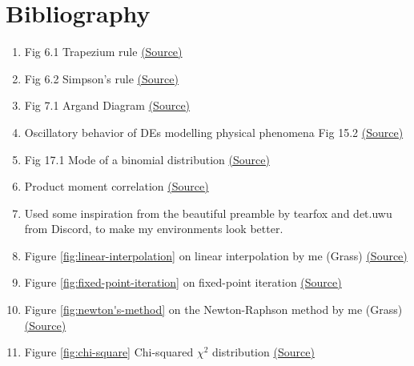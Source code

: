 \documentclass[oneside]{book}
\begin{document}
\chapter{Bibliography}
\begin{enumerate}
  \item Fig 6.1 Trapezium rule \href{https://tex.stackexchange.com/a/110618}{(Source)}
  \item Fig 6.2 Simpson's rule \href{https://tex.stackexchange.com/a/439119}{(Source)}
  \item Fig 7.1 Argand Diagram \href{https://tex.stackexchange.com/a/466846}{(Source)}
  \item Oscillatory behavior of DEs modelling physical phenomena Fig 15.2 \href{https://tikz.net/dynamics_oscillator/}{(Source)}
  \item Fig 17.1 Mode of a binomial distribution \href{https://math.oxford.emory.edu/site/math117/normalApproxToBinomial/}{(Source)}
  \item Product moment correlation \href{https://www.ncl.ac.uk/webtemplate/ask-assets/external/maths-resources/images/R_value.png}{(Source)}
  \item Used some inspiration from the beautiful preamble by tearfox and det.uwu from Discord, to make my environments look better.
  \item Figure \ref{fig:linear-interpolation} on linear interpolation by me (Grass) \href{https://www.desmos.com/calculator/jp52nra5le}{(Source)}
  \item Figure \ref{fig:fixed-point-iteration} on  fixed-point iteration \href{https://www.aprendematematicas.org.mx/metodo-del-punto-fijo-codigo-latex2e/}{(Source)}
  \item Figure \ref{fig:newton's-method} on the Newton-Raphson method by me (Grass) \href{https://www.desmos.com/calculator/izkg4ynlfp}{(Source)}
  \item Figure \ref{fig:chi-square} Chi-squared \(\chi^2\) distribution \href{https://commons.wikimedia.org/wiki/File:Chi-square_pdf.svg}{(Source)}
\end{enumerate}
\end{document}
